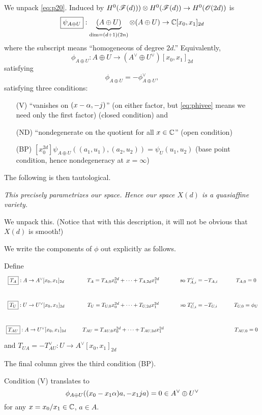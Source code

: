 {We unpack \eqref{eq:p20}.  Induced by $H^0({\mathscr{F}}(d))) \otimes H^0({\mathscr{F}}(d)) \rightarrow H^0({\mathscr{O}}(2d))$ is
$$
\boxed{\psi_{A \oplus U}} : \underbrace{(A \oplus U)}_{\text{dim}=(d+1)(2n)} \otimes (A \oplus U) \rightarrow \mathbb{C}[x_0, x_1]_{2d}$$
where the subscript means ``homogeneous of degree $2d$.'' Equivalently,
$$
\boxed{\phi_{A \oplus U}} : A \oplus U \rightarrow (A^\vee \oplus U^\vee)[x_0, x_1]_{2d}$$
satisfying \begin{equation}
  \label{eq:phivee}
  \phi_{A \oplus U} = - \phi^\vee_{A \oplus U},
  \end{equation}
satisfying three conditions:
\begin{enumerate}
\item[(V)] ``vanishes on $(x-\alpha, -j)$'' (on either factor, but \eqref{eq:phivee} means we need only the first factor) (closed condition) and
  \item[(ND)]  ``nondegenerate on the quotient for all $x \in \mathbb{C}$''  (open condition)
  \item[(BP)] $[x_0^{2d}] \psi_{A \oplus U} ( (a_1, u_1), (a_2, u_2)) = \psi_U(u_1, u_2)$ (base point condition, hence nondegeneracy at $x =\infty$) 
\end{enumerate}

The following is then tautological.

 {\em This precisely parametrizes our space. Hence our space $X(d)$ is a quasiaffine variety.}


We unpack this.  (Notice that with this description, it will not be obvious that $X(d)$ is smooth!)

We write the components of $\phi$ out explicitly as follows.

Define
$$\xymatrix{\boxed{T_A}: A \rightarrow A^\vee[x_0, x_1]_{2d} &
T_A = T_{A,0}x_0^{2d} + \cdots + T_{A,2d} x_1^{2d} & \text{so } T_{A,i}^\vee = - T_{A,i} & T_{A,0}=0 \\
  \boxed{T_U}: U \rightarrow U^\vee[x_0, x_1]_{2d} & T_U = T_{U,0}x_0^{2d} + \cdots + T_{U,2d} x_1^{2d} & \text{so } T_{U,i}^\vee = - T_{U,i} & T_{U,0}=\phi_U  \\
  \boxed{T_{AU}}: A \rightarrow U^\vee[x_0, x_1]_{2d} & T_{AU} = T_{AU,0}x_0^{2d} + \cdots + T_{AU,2d} x_1^{2d} &  & T_{AU,0}=0
}$$
and $\boxed{T_{UA}} = - T_{AU}^\vee: U \rightarrow A^\vee[x_0, x_1]_{2d}$

The final column gives the third condition (BP).

Condition (V) translates to
$$
\phi_{A \oplus U}(  (x_0-x_1 \alpha) a, -x_1 ja) =0 \in A^\vee \oplus U^\vee$$
for any $x =x_0/x_1 \in \mathbb{C}$, $a \in A$.  

}

